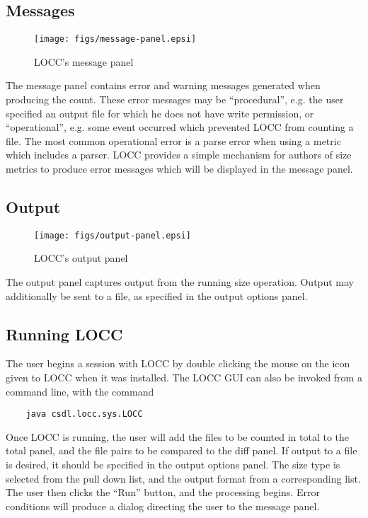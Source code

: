 \subsection{Messages}

\begin{figure}
  \texttt{[image: figs/message-panel.epsi]}
  \caption{LOCC's message panel}
  \label{fig:message-panel}
\end{figure}

The message panel contains error and warning messages generated when
producing the count.  These error messages may be ``procedural'',
e.g. the user specified an output file for which he does not have write
permission, or ``operational'', e.g. some event occurred which
prevented LOCC from counting a file.  The most common operational
error is a parse error when using a metric which includes a
parser.  LOCC provides a simple mechanism for authors of size metrics 
to produce error messages which will be displayed in the message
panel.

\subsection{Output}

\begin{figure}
  \texttt{[image: figs/output-panel.epsi]}
  \caption{LOCC's output panel}
  \label{fig:output-panel}
\end{figure}

The output panel captures output from the running size operation.
Output may additionally be sent to a file, as specified in the output
options panel.  

\subsection{Running LOCC}

The user begins a session with LOCC by double clicking the mouse on
the icon given to LOCC when it was installed.  The LOCC GUI can also
be invoked from a command line, with the command 
\begin{verbatim}    java csdl.locc.sys.LOCC\end{verbatim}  

Once LOCC is running, the user will add the files to be counted in
total to the total panel, and the file pairs to be compared to the
diff panel.  If output to a file is desired, it should be specified in 
the output options panel.  The size type is selected from the pull down 
list, and the output format from a corresponding list.  The user then
clicks the ``Run'' button, and the processing begins.  Error
conditions will produce a dialog directing the user to the message
panel.  

